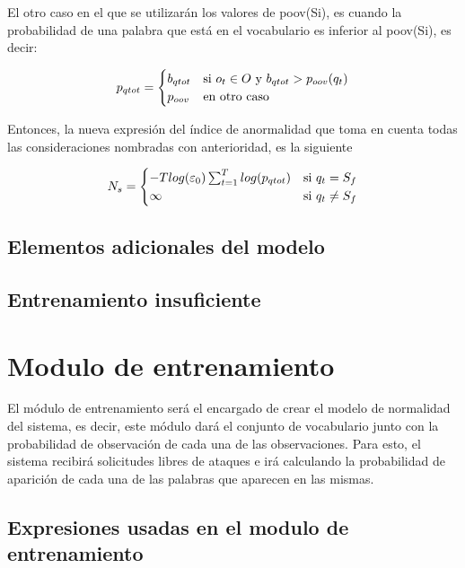 El otro caso en el que se utilizarán los valores de poov(Si), es cuando la probabilidad de una palabra que está en el vocabulario es inferior al poov(Si), es decir:


\begin{equation}
p_{qtot} = 
	\begin{cases} 
      b_{qtot} & $si $  o_{t} \in O $ y $ b_{qtot} > p_{oov}(q_{t})\\
      p_{oov} & $en otro caso$ \\ 
   \end{cases}
\end{equation}


Entonces, la nueva expresión del índice de anormalidad que toma en cuenta todas las consideraciones nombradas con anterioridad, es la siguiente

\begin{equation}
N_{s} = 
	\begin{cases} 
      -Tlog(\varepsilon_{0})\sum_{t=1}^{T}log(p_{qtot}) & $si $  q_{t} = S_{f} \\
      \infty & $si $  q_{t} \neq S_{f} \\ 
   \end{cases}
\end{equation}

\subsection{Elementos adicionales del modelo}
\subsection*{Entrenamiento insuficiente}
\section{Modulo de entrenamiento}

El módulo de entrenamiento será el encargado de crear el modelo de normalidad del sistema, es decir, este módulo dará el conjunto de vocabulario junto con la probabilidad de observación de cada una de las observaciones. Para esto, el sistema recibirá solicitudes libres de ataques e irá calculando la probabilidad de aparición de cada una de las palabras que aparecen en las mismas.

\subsection{Expresiones usadas en el modulo de entrenamiento}

